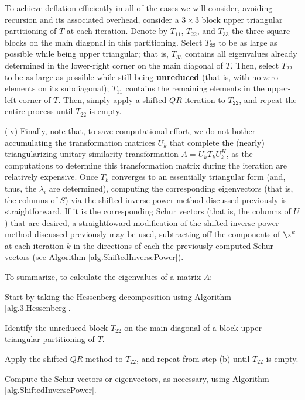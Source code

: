 To achieve deflation efficiently in all of the cases we will consider, avoiding recursion and its associated overhead,
consider a $3\times 3$ block upper triangular partitioning of $T$ at each iteration.
Denote by $T_{11}$, $T_{22}$, and $T_{33}$ the three square blocks on the main diagonal in
this partitioning.  Select $T_{33}$ to be as large as possible
while being upper triangular; that is, $T_{33}$ contains all eigenvalues already determined
in the lower-right corner on the main diagonal of $T$.  Then, select $T_{22}$
to be as large as possible while still being {\bf unreduced} (that is, with
no zero elements on its subdiagonal); $T_{11}$ contains the remaining elements in the upper-left corner of $T$.
Then, simply apply a shifted $QR$ iteration to $T_{22}$, and repeat the entire process until $T_{22}$ is empty.\label{par:T22isolation}\vskip0.1in

\noindent (iv)
Finally, note that, to save computational effort, we do not bother accumulating the transformation matrices $U_k$ that
complete the (nearly) triangularizing unitary similarity transformation $A=U_k T_k U_k^H$, as the computations to determine this transformation matrix
during the iteration are relatively expensive.  
Once $T_k$ converges to an essentially triangular form (and, thus, the $\lambda_i$ are determined), computing the corresponding eigenvectors (that is, the columns of $S$) via the shifted inverse power method discussed previously is straightforward.
If it is the corresponding Schur vectors (that is, the columns of $U$) that are desired, a straightfoward modification of the shifted inverse power method discussed previously may be used,
subtracting off the components of $\x^{k}$ at each iteration $k$ in the directions of each the previously computed Schur vectors (see Algorithm \ref{alg.ShiftedInversePower}). \vskip0.08in

\noindent To summarize, to calculate the eigenvalues of a matrix $A$:
\beginmylistb
\item[(a)] Start by taking the Hessenberg decomposition using Algorithm \ref{alg.3.Hessenberg}.
\item[(b)] Identify the unreduced block $T_{22}$ on the main diagonal of a block upper triangular partitioning of $T$.
\item[(c)] Apply the shifted $QR$ method to $T_{22}$, and repeat from step (b) until $T_{22}$ is empty. 
\item[(d)] Compute the Schur vectors or eigenvectors, as necessary, using Algorithm \ref{alg.ShiftedInversePower}.
\endmylist \vskip0.08in

